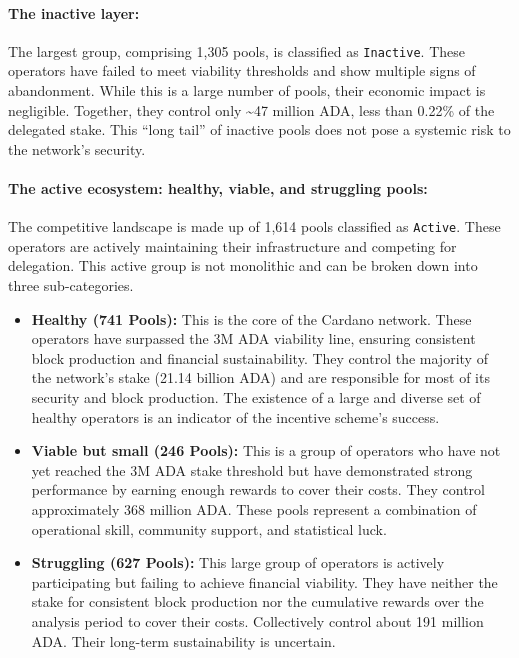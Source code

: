 \documentclass[11pt, letterpaper]{article}
\begin{document}
\paragraph{The inactive layer:} The largest group, comprising 1,305 pools, is
classified as \texttt{Inactive}. These operators have failed to meet viability thresholds and show multiple
signs of abandonment. While this is a large number of pools, their economic
impact is negligible. Together, they control only \textasciitilde47 million
ADA, less than 0.22\% of the delegated stake. This ``long tail'' of inactive
pools does not pose a systemic risk to the network's security.

\paragraph{The active ecosystem: healthy, viable, and struggling pools:} The competitive landscape is made up of 1,614 pools classified as
\texttt{Active}. These operators are actively maintaining their infrastructure
and competing for delegation. This active group is not monolithic and can be
broken down into three sub-categories.
\begin{itemize}
	\item \textbf{Healthy (741 Pools):} This is the core of the Cardano network. These operators have surpassed
	      the 3M ADA viability line, ensuring consistent block production and financial sustainability. They control
	      the majority of the network's stake (21.14 billion ADA) and are responsible for most of its security and
	      block production. The existence of a large and diverse set of healthy operators is an indicator of the
	      incentive scheme's success.
	\item \textbf{Viable but small (246 Pools):} This is a group of operators who have not yet reached the 3M
	      ADA stake threshold but have demonstrated strong performance by earning enough rewards to cover their
	      costs. They control approximately 368 million ADA\@. These pools represent a combination of operational
	      skill, community support, and statistical luck.
	\item \textbf{Struggling (627 Pools):} This large group of operators is actively participating but failing
	      to achieve financial viability. They have neither the stake for consistent block production nor the cumulative
	      rewards over the analysis period to cover their costs. Collectively control about 191 million ADA\@. Their long-term
	      sustainability is uncertain.
\end{itemize}
\end{document}
